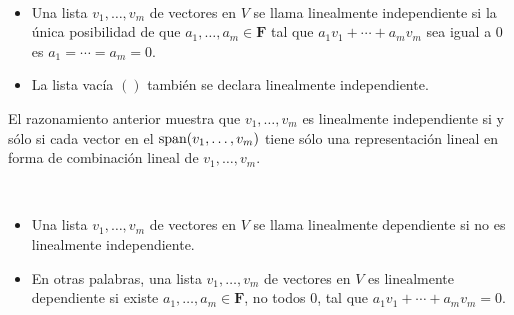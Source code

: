 \begin{mydef}\,\\
    \begin{itemize}
	\item Una lista $v_1,\ldots,v_m$ de vectores en $V$ se llama linealmente independiente si la única posibilidad de que  $a_1,\ldots,a_m\in \textbf{F}$ tal que $a_1v_1+\cdots+a_mv_m$ sea igual a $0$ es $a_1=\cdots=a_m=0.$
	\item La lista vacía $()$ también se declara linealmente independiente.
    \end{itemize}
\end{mydef}

El razonamiento anterior muestra que $v_1,\ldots,v_m$ es linealmente independiente si y sólo si cada vector en el $\mathop{\mbox{\normalfont span}}\nolimits(v_1,\ldots,v_m)$ tiene sólo una representación lineal en forma de combinación lineal de $v_1,\ldots,v_m$.

\setcounter{mydef}{18}
\begin{mydef}\,\\
    \begin{itemize}
	\item Una lista $v_1,\ldots,v_m$ de vectores en $V$ se llama linealmente dependiente si no es linealmente independiente.
	\item En otras palabras, una lista $v_1,\ldots,v_m$ de vectores en $V$ es linealmente dependiente si existe $a_1,\ldots,a_m\in \textbf{F}$, no todos $0$, tal que $a_1v_1+\cdots+a_mv_m=0$.
    \end{itemize}
\end{mydef}

